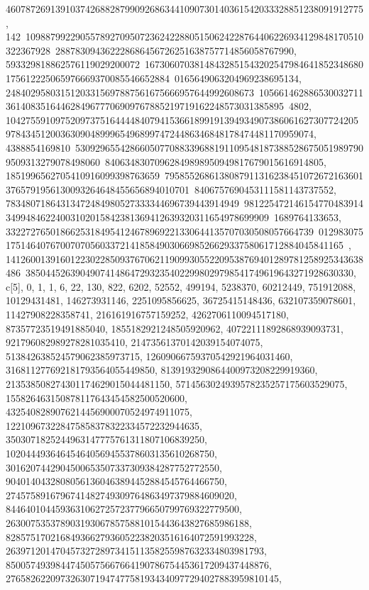 {{{460787269139103742688287990926863441090730140361542033328851238091912775, 142\
10988799229055789270950723624228805150624228764406226934129848170510322367928\
288783094362228686456726251638757714856058767990, 593329818862576119029200072\
16730607038148432851543202547984641852348680175612225065976669370085546652884\
0165649063204969238695134, 24840295803151203315697887561675666957644992608673\
10566146288653003271136140835164462849677706909767885219719162248573031385895\
4802, 10427559109752097375164444840794153661899191394934907386061627307724205\
97843451200363090489996549689974724486346848178474481170959074, 4388854169810\
53092965542866050770883396881911095481873885286750519897909509313279078498060\
84063483070962849898950949817679015616914805, 1851996562705410916099398763659\
79585526861380879113162384510726721636013765791956130093264648455656894010701\
8406757690453111581143737552, 78348071864313472484980527333344696739443914949\
98122547214615477048391434994846224003102015842381369412639320311654978699909\
1689764133653, 33227276501866253184954124678969221330644135707030508057664739\
01298307517514640767007070560337214185849030669852662933758061712884045841165\
, 141260013916012230228509376706211909930552209538769401289781258925343638486\
385044526390490741486472932354022998029798541749619643271928630330}}, 
 {c[5], {0, 1, 1, 6, 22, 130, 822, 6202, 52552, 499194, 5238370, 60212449, 
   751912088, 10129431481, 146273931146, 2251095856625, 36725415148436, 
   632107359078601, 11427908228358741, 216161916757159252, 
   4262706110094517180, 87357723519491885040, 1855182921248505920962, 
   40722111892868939093731, 921796082989278281035410, 
   21473561370142039154074075, 513842638524579062385973715, 
   12609066759370542921964031460, 316811277692181793564055449850, 
   8139193290864400973208229919360, 213538508274301174629015044481150, 
   5714563024939578235257175603529075, 155826463150878117643454582500520600, 
   4325408289076214456900070524974911075, 
   122109673228475858378322334572232944635, 
   3503071825244963147775761311807106839250, 
   102044493646454640569455378603135610268750, 
   3016207442904500653507337309384287752772550, 
   90401404328080561360463894452884545764466750, 
   2745758916796741482749309764863497379884609020, 
   84464010445936310627257237796650799769322779500, 
   2630075353789031930678575881015443643827685986188, 
   82857517021684936627936052238203516164072591993228, 
   2639712014704573272897341511358255987632334803981793, 
   85005749398447450575667664190786754453617209437448876, 
   2765826220973263071947477581934340977294027883959810145, 
}}}
